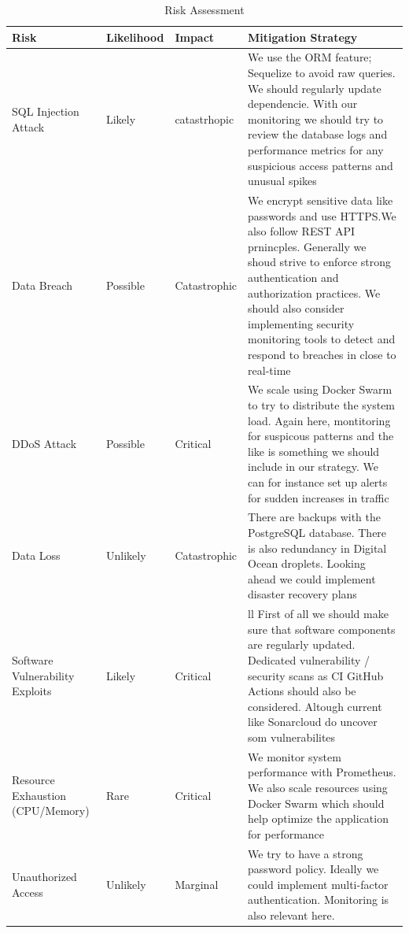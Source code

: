 \documentclass[11pt]{article}
\begin{document}
\begin{table}[H]
    \centering
    \caption{Risk Assessment}
    \begin{tabular}{|p{3cm}|p{2cm}|p{2cm}|p{6cm}|}
        \hline
        \textbf{Risk} & \textbf{Likelihood} & \textbf{Impact} & \textbf{Mitigation Strategy} \\
        \hline
        SQL Injection Attack & Likely & catastrhopic & We use the ORM feature; Sequelize to avoid raw queries. We should regularly update dependencie. With our monitoring we should try to review the database logs and performance metrics for any suspicious access patterns and unusual spikes \\
        \hline
        Data Breach & Possible & Catastrophic & We encrypt sensitive data like passwords and use HTTPS.We also follow REST API prnincples. Generally we shoud strive to enforce strong authentication and authorization practices. We should also consider implementing security monitoring tools to detect and respond to breaches in close to real-time \\
        \hline
        DDoS Attack & Possible & Critical &  We scale using Docker Swarm to try to distribute the system load. Again here, montitoring for suspicous patterns and the like is something we should include in our strategy. We can for instance set up alerts for sudden increases in traffic \\
        \hline
        Data Loss & Unlikely & Catastrophic & There are backups with the PostgreSQL database. There is also  redundancy in Digital Ocean droplets. Looking ahead we could  implement disaster recovery plans \\
        \hline
        Software Vulnerability Exploits & Likely & Critical & ll First of all we should make sure that software components are regularly updated. Dedicated vulnerability / security scans as CI GitHub Actions should also be considered. Altough current like Sonarcloud do uncover som vulnerabilites  \\
        \hline
        Resource Exhaustion (CPU/Memory) & Rare & Critical & We monitor system performance with Prometheus. We also scale resources using Docker Swarm which should help optimize the application for performance \\
        \hline
        Unauthorized Access & Unlikely & Marginal & We try to have a  strong password policy. Ideally we could implement multi-factor authentication. Monitoring is also relevant here.  \\
        \hline
    \end{tabular}
    \label{tab:risk-assessment}
\end{table}
\end{document}
